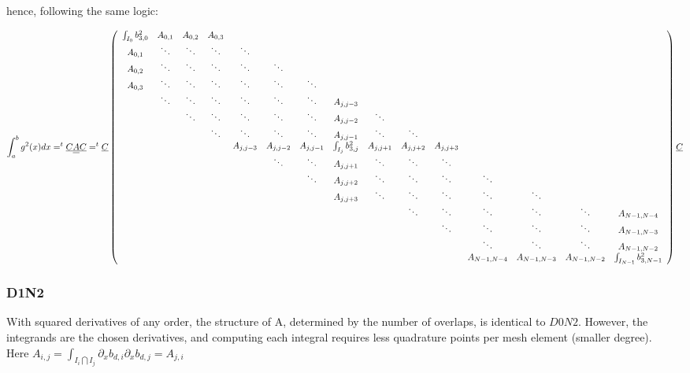 \documentclass[paper=a4, fontsize=11pt]{scrartcl}
\numberwithin{equation}{section}		%
\numberwithin{figure}{section}			%
\numberwithin{table}{section}				%
\begin{document}
\begin{landscape}
hence, following the same logic:

$$
\int_{a}^{b} g^2(x)dx = ^t\underline{C}\underline{\underline{A}}\underline{C} = ^t\underline{C} \left(\begin{array}{ccccccccccccccc}
\int_{I_0}b_{3,0}^2&A_{0,1}&A_{0,2}&A_{0,3}&&&&&&&&&&&\\ A_{0,1}&\ddots&\ddots&\ddots&\ddots&&&&&&&&&&\\ A_{0,2}&\ddots&\ddots&\ddots&\ddots&\ddots&&&&&&&&&\\ A_{0,3}&\ddots&\ddots&\ddots&\ddots&\ddots&\ddots&&&&&&&&\\
&\ddots&\ddots&\ddots&\ddots&\ddots&\ddots&A_{j,j-3}&&&&&&&\\ &&\ddots&\ddots&\ddots&\ddots&\ddots&A_{j,j-2}&\ddots&&&&&&\\ &&&\ddots&\ddots&\ddots&\ddots&A_{j,j-1}&\ddots&\ddots&&&&&\\
&&&&A_{j,j-3}&A_{j,j-2}&A_{j,j-1}&\int_{I_j}b_{3,j}^2&A_{j,j+1}&A_{j,j+2}&A_{j,j+3}&&&&\\
&&&&&\ddots&\ddots&A_{j,j+1}&\ddots&\ddots&\ddots&&&&\\ &&&&&&\ddots&A_{j,j+2}&\ddots&\ddots&\ddots&\ddots&&&\\ &&&&&&&A_{j,j+3}&\ddots&\ddots&\ddots&\ddots&\ddots&&\\
&&&&&&&&&\ddots&\ddots&\ddots&\ddots&\ddots&A_{N-1,N-4}\\ &&&&&&&&&&\ddots&\ddots&\ddots&\ddots&A_{N-1,N-3}\\
&&&&&&&&&&&\ddots&\ddots&\ddots&A_{N-1,N-2}\\ &&&&&&&&&&&A_{N-1,N-4}&A_{N-1,N-3}&A_{N-1,N-2}&\int_{I_{N-1}}b_{3,N-1}^2
\end{array}\right) \underline{C}\\
$$

\newpage
\subsubsection{D1N2}

With squared derivatives of any order, the structure of A, determined by the number of overlaps, is identical to $D0N2$.
However, the integrands are the chosen derivatives, and computing each integral requires less quadrature points per mesh element (smaller degree).\\
Here $A_{i,j} = \int_{I_i\bigcap I_j}\partial_xb_{d,i}\partial_xb_{d,j} = A_{j,i}$


\end{landscape}
\end{document}

